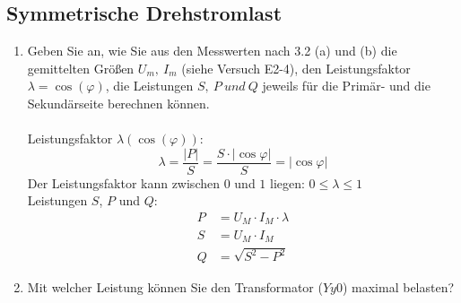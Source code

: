 \subsection{Symmetrische Drehstromlast }
\begin{enumerate}[label=\alph*)]
  \item Geben Sie an, wie Sie aus den Messwerten nach 3.2 (a) und (b) die gemittelten
        Größen $U_m,\ I_m$ (siehe Versuch E2-4), den Leistungsfaktor
        $\lambda=\cos(\varphi)$, die Leistungen $S,\ P\ und\ Q$ jeweils für die Primär-
        und die Sekundärseite berechnen können.\\ \ \\ Leistungsfaktor $\lambda(\cos
            (\varphi))$:
        \[ \lambda = \frac{|P|}{S}=\frac{S\cdot |\cos \varphi|}{S} = |\cos \varphi| \]
        Der Leistungsfaktor kann zwischen $0$ und $1$ liegen: $0 \leq \lambda \leq 1
        $\\ Leistungen $S$, $P$ und $Q$:\\
        \begin{align*}
          P & = U_M\cdot I_M\cdot \lambda \\
          S & = U_M\cdot I_M              \\
          Q & = \sqrt{S^2-P^2}
        \end{align*}

  \item Mit welcher Leistung können Sie den Transformator ($Yy0$) maximal belasten?
\end{enumerate}
